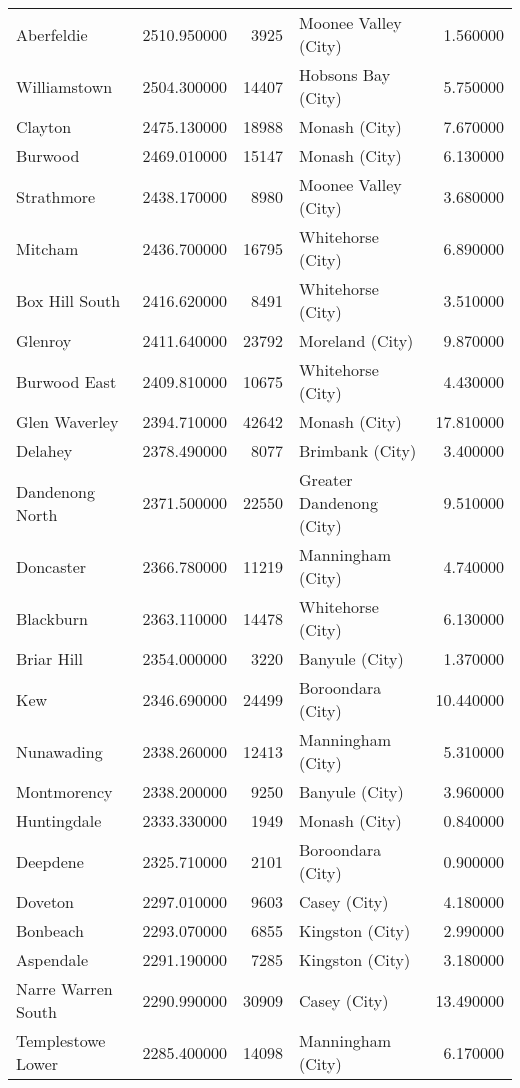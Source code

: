 \begin{table}
\begin{tabular}{lrrlr}
Aberfeldie & 2510.950000 & 3925 & Moonee Valley (City) & 1.560000 \\
Williamstown & 2504.300000 & 14407 & Hobsons Bay (City) & 5.750000 \\
Clayton & 2475.130000 & 18988 & Monash (City) & 7.670000 \\
Burwood & 2469.010000 & 15147 & Monash (City) & 6.130000 \\
Strathmore & 2438.170000 & 8980 & Moonee Valley (City) & 3.680000 \\
Mitcham & 2436.700000 & 16795 & Whitehorse (City) & 6.890000 \\
Box Hill South & 2416.620000 & 8491 & Whitehorse (City) & 3.510000 \\
Glenroy & 2411.640000 & 23792 & Moreland (City) & 9.870000 \\
Burwood East & 2409.810000 & 10675 & Whitehorse (City) & 4.430000 \\
Glen Waverley & 2394.710000 & 42642 & Monash (City) & 17.810000 \\
Delahey & 2378.490000 & 8077 & Brimbank (City) & 3.400000 \\
Dandenong North & 2371.500000 & 22550 & Greater Dandenong (City) & 9.510000 \\
Doncaster & 2366.780000 & 11219 & Manningham (City) & 4.740000 \\
Blackburn & 2363.110000 & 14478 & Whitehorse (City) & 6.130000 \\
Briar Hill & 2354.000000 & 3220 & Banyule (City) & 1.370000 \\
Kew & 2346.690000 & 24499 & Boroondara (City) & 10.440000 \\
Nunawading & 2338.260000 & 12413 & Manningham (City) & 5.310000 \\
Montmorency & 2338.200000 & 9250 & Banyule (City) & 3.960000 \\
Huntingdale & 2333.330000 & 1949 & Monash (City) & 0.840000 \\
Deepdene & 2325.710000 & 2101 & Boroondara (City) & 0.900000 \\
Doveton & 2297.010000 & 9603 & Casey (City) & 4.180000 \\
Bonbeach & 2293.070000 & 6855 & Kingston (City) & 2.990000 \\
Aspendale & 2291.190000 & 7285 & Kingston (City) & 3.180000 \\
Narre Warren South & 2290.990000 & 30909 & Casey (City) & 13.490000 \\
Templestowe Lower & 2285.400000 & 14098 & Manningham (City) & 6.170000 \\

\end{tabular}
\end{table}
